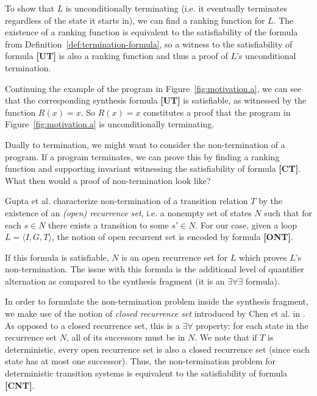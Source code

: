 \documentclass[preprint]{sigplanconf}
\theoremstyle{definition}
\begin{document}
To show that $L$ is unconditionally terminating (i.e. it eventually terminates regardless of the
state it starts in), we can find a ranking function for $L$.
The existence of a ranking function is equivalent to the satisfiability
of the formula from Definition~\ref{def:termination-formula}, so a witness to the satisfiability
of formula {\bf [UT]} is also a ranking function and thus a proof of $L$'s unconditional termination.

Continuing the example of the program in Figure~\ref{fig:motivation.a}, we can see that
the corresponding synthesis formula {\bf [UT]} is satisfiable, as witnessed by the function $R(x) = x$.
So $R(x) = x$ constitutes a proof that the program in Figure~\ref{fig:motivation.a} is unconditionally
terminating.

Dually to termination, we might want to consider the non-termination of a program.  If a program terminates,
we can prove this by finding a ranking function and supporting invariant witnessing the satisfiability
of formula {\bf[CT]}.  What then would a proof of non-termination look like?

Gupta et al. \cite{DBLP:conf/popl/GuptaHMRX08} characterize non-termination of a transition relation $T$ by the existence of an \emph{(open) recurrence set},
i.e. a nonempty set of states $N$ such that for each $s \in N$ there
exists a transition to some $s'\in N$. 
For our case, given a loop $L = \langle I,G,T \rangle$, the notion of open recurrent set is encoded by formula {\bf [ONT]}. %

If this formula is satisfiable, $N$ is an open recurrence set for $L$ which proves
$L$'s non-termination. The issue with this formula is the additional level of quantifier alternation as compared to the synthesis fragment
(it is an $\exists \forall \exists$ formula). %

In order to formulate the non-termination problem inside the synthesis fragment, 
we make use of the notion of \emph{closed recurrence set} introduced by Chen et al. in \cite{DBLP:conf/tacas/ChenCFNO14}. 
As opposed to a closed recurrence set, this is a $\exists \forall$ property: for each state in the recurrence set $N$, all of its successors 
must be in $N$. We note that if $T$ is deterministic, every open recurrence set is also a closed recurrence set (since each
state has at most one successor).  Thus, the non-termination problem for deterministic transition systems is equivalent to the
satisfiability of formula {\bf [CNT]}. %
\end{document}
